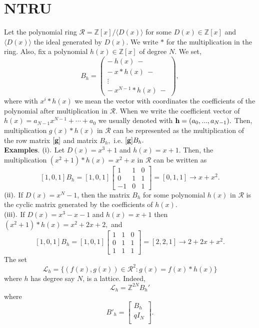 \documentclass{amsart}
\numberwithin{equation}{section}
\begin{document}
\section{NTRU}\label{sec:ntru}
Let the polynomial ring ${\mathcal{R}}={\mathbb{Z}}[x]/\langle D(x) \rangle$ for some $D(x)\in {\mathbb{Z}}[x]$ and $\langle D(x) \rangle$ the ideal generated by $D(x).$ We write $*$ for the multiplication in the ring. Also, fix a polynomial $h(x)\in {\mathbb{Z}}[x]$ of degree $N.$ We set, 
\begin{equation}\label{B_h}
B_h = \begin{pmatrix}
-\ h(x)\ - \\
-\ x*h(x)\ - \\
\vdots\\
-\ x^{N-1}*h(x)\ -
\end{pmatrix},
\end{equation}
where with $x^{i}*h(x)$ we mean the vector with coordinates the coefficients of the polynomial after multiplication in ${\mathcal{R}}.$ When we write the coefficient vector of $h(x)=a_{N-1}x^{N-1}+\cdots + a_0$ we usually denoted with ${\textbf h}=(a_0,...,a_{N-1}).$
Then, multiplication $g(x)*h(x)$ in ${\mathcal{R}}$ can be represented as the multiplication of the row matrix $[{\textbf g}]$ and matrix $B_h,$ i.e. $[{\textbf g}]B_h.$\\
{\textbf{Examples}}. $({\rm i}).$ Let $D(x)=x^3+1$ and $h(x)=x+1.$ Then, the multiplication $(x^2+1)*h(x) = x^2 + x$ in ${\mathcal{R}}$ can be written as 
$$[1,0,1]B_h=[1,0,1]\begin{bmatrix}
1&1&0\\
0&1&1\\
-1&0 &1
\end{bmatrix} = [0,1,1]\rightarrow x+x^2.$$
$({\rm ii}).$ If $D(x)=x^N-1$, then the matrix $B_h$ for some polynomial $h(x)$ in ${\mathcal{R}}$ is the cyclic matrix generated by the coefficients of $h(x).$\\
$({\rm iii}).$ If $D(x)=x^3-x-1$ and $h(x)=x+1$ then $(x^2+1)*h(x)=x^2+2x+2,$ and
$$[1,0,1]B_h=[1,0,1]\begin{bmatrix}
1&1&0\\
0&1&1\\
1&1 &1
\end{bmatrix} = [2,2,1]\rightarrow 2+2x+x^2.$$
The set 
$${\mathcal{L}}_h=\{(f(x),g(x))\in {\mathcal{R}}^2 : g(x)=f(x)*h(x)\}$$ where $h$ has degree say $N$, is a lattice. Indeed,
$${\mathcal{L}}_h={\mathbb{Z}}^{2N}B_h'$$ where 
$$B'_h=		\left[\begin{array}{c}
			 B_h  \\
			\hline
			qI_N   \\
		\end{array}\right].
			$$
\end{document}
